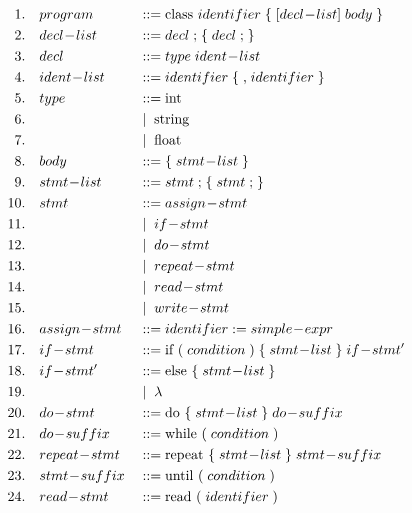 \documentclass[12pt,a4paper]{article}
\begin{document}
\begin{align*}
\hspace*{2em}1.&\quad program &&::= \text{class } identifier \; \text{\{} \; {[decl\!-\!list]} \; body \; \text{\}} \\
2.&\quad decl\!-\!list &&::= decl \; \text{;} \; \{ \; decl \; \text{;} \; \} \\
3.&\quad decl &&::= type \; ident\!-\!list \\
4.&\quad ident\!-\!list &&::= identifier \; \{ \; \text{,} \; identifier \; \} \\
5.&\quad type &&::= \text{int} \\
6.&\quad &&\mid \; \text{string} \\
7.&\quad &&\mid \; \text{float} \\
8.&\quad body &&::= \text{\{} \; stmt\!-\!list \; \text{\}} \\
9.&\quad stmt\!-\!list &&::= stmt \; \text{;} \; \{ \; stmt \; \text{;} \; \} \\
10.&\quad stmt &&::= assign\!-\!stmt \\
11.&\quad &&\mid \; if\!-\!stmt \\
12.&\quad &&\mid \; do\!-\!stmt \\
13.&\quad &&\mid \; repeat\!-\!stmt \\
14.&\quad &&\mid \; read\!-\!stmt \\
15.&\quad &&\mid \; write\!-\!stmt \\
16.&\quad assign\!-\!stmt &&::= identifier \; \text{:=} \; simple\!-\!expr \\
17.&\quad if\!-\!stmt &&::= \text{if } \text{(} \; condition \; \text{)} \; \text{\{} \; stmt\!-\!list \; \text{\}} \; if\!-\!stmt' \\
18.&\quad if\!-\!stmt' &&::= \text{else } \text{\{} \; stmt\!-\!list \; \text{\}} \\
19.&\quad &&\mid \; \lambda \\
20.&\quad do\!-\!stmt &&::= \text{do } \text{\{} \; stmt\!-\!list \; \text{\}} \; do\!-\!suffix \\
21.&\quad do\!-\!suffix &&::= \text{while } \text{(} \; condition \; \text{)} \\
22.&\quad repeat\!-\!stmt &&::= \text{repeat } \text{\{} \; stmt\!-\!list \; \text{\}} \; stmt\!-\!suffix \\
23.&\quad stmt\!-\!suffix &&::= \text{until } \text{(} \; condition \; \text{)} \\
24.&\quad read\!-\!stmt &&::= \text{read } \text{(} \; identifier \; \text{)} \\

\end{align*}
\end{document}
